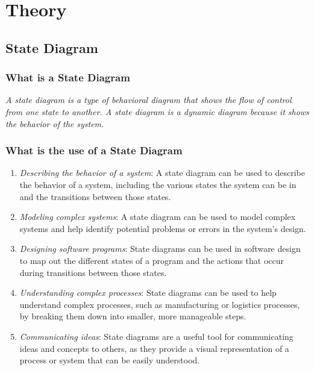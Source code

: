 \documentclass[11pt]{article}
\begin{document}
\section{Theory}

\subsection{State Diagram}

\subsubsection{What is a State Diagram}

\textit{A state diagram is a type of behavioral diagram that shows the flow of control from one state to another. A state diagram is a dynamic diagram because it shows the behavior of the system.}

\subsubsection{What is the use of a State Diagram}

\begin{enumerate}
	\item \textit{Describing the behavior of a system}: A state diagram can be used to describe the behavior of a system, including the various states the system can be in and the transitions between those states.

	\item \textit{Modeling complex systems}: A state diagram can be used to model complex systems and help identify potential problems or errors in the system's design.

	\item \textit{Designing software programs}: State diagrams can be used in software design to map out the different states of a program and the actions that occur during transitions between those states.

	\item \textit{Understanding complex processes}: State diagrams can be used to help understand complex processes, such as manufacturing or logistics processes, by breaking them down into smaller, more manageable steps.

	\item \textit{Communicating ideas}: State diagrams are a useful tool for communicating ideas and concepts to others, as they provide a visual representation of a process or system that can be easily understood.
\end{enumerate}
\end{document}

